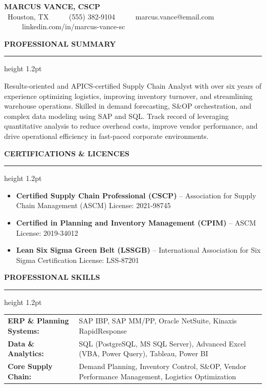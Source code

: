 \documentclass{article}
\newcommand{\resumesection}[1]{%
  \vspace{8pt}%
  {\color{primary}\large\bfseries\MakeUppercase{#1}}\\%
  \vspace{-6pt}%
  {\color{primary}\hrule height 1.2pt}%
  \vspace{6pt}%
}
\begin{document}
\pagestyle{empty}
\color{text}

\begin{center}
  {\Huge\bfseries\color{primary} MARCUS VANCE, CSCP}\\
  \vspace{3pt}
  {\color{text}\small
    \faMapMarker\ Houston, TX \ \ \textbullet\ \  
    \faPhone\ (555) 382-9104 \ \ \textbullet\ \  
    \faEnvelope\ marcus.vance@email.com \ \ \textbullet\ \  
    \faLinkedin\ linkedin.com/in/marcus-vance-sc
  }
\end{center}

\vspace{-6pt}

\resumesection{Professional Summary}
Results-oriented and APICS-certified Supply Chain Analyst with over six years of experience optimizing logistics, improving inventory turnover, and streamlining warehouse operations. Skilled in demand forecasting, S\&OP orchestration, and complex data modeling using SAP and SQL. Track record of leveraging quantitative analysis to reduce overhead costs, improve vendor performance, and drive operational efficiency in fast-paced corporate environments.

\resumesection{Certifications \& Licences}
\begin{itemize}
  \item \textbf{Certified Supply Chain Professional (CSCP)} -- Association for Supply Chain Management (ASCM) \hfill License: 2021-98745
  \item \textbf{Certified in Planning and Inventory Management (CPIM)} -- ASCM \hfill License: 2019-34012
  \item \textbf{Lean Six Sigma Green Belt (LSSGB)} -- International Association for Six Sigma Certification \hfill License: LSS-87201
\end{itemize}

\resumesection{Professional Skills}
\begin{tabularx}{\textwidth}{@{}l X@{}}
  \textbf{ERP \& Planning Systems:} & SAP IBP, SAP MM/PP, Oracle NetSuite, Kinaxis RapidResponse \\
  \textbf{Data \& Analytics:} & SQL (PostgreSQL, MS SQL Server), Advanced Excel (VBA, Power Query), Tableau, Power BI \\
  \textbf{Core Supply Chain:} & Demand Planning, Inventory Control, S\&OP, Vendor Performance Management, Logistics Optimization \\
\end{tabularx}
\end{document}
